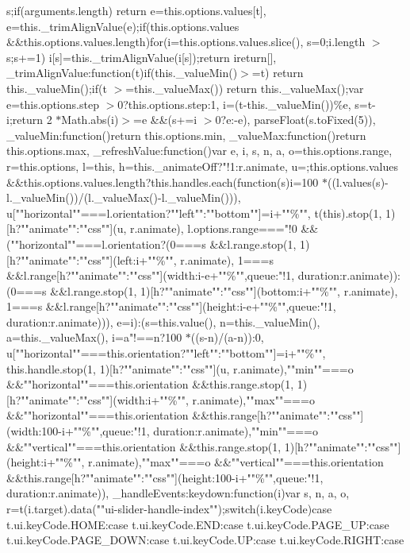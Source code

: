 {s;if(arguments.\+length) return e=this.\+options.\+values[t], e=this.\+\_\+trim\+Align\+Value(e);if(this.\+options.\+values \&\&this.\+options.\+values.\+length)\lcurly{}for(i=this.\+options.\+values.\+slice(), s=0;i.\+length $>$s;s+=1) i[s]=this.\+\_\+trim\+Align\+Value(i[s]);return i\rcurly{}return[]\rcurly{}, \+\_\+trim\+Align\+Value\+:function(t)\lcurly{}if(this.\+\_\+value\+Min()$>$=t) return this.\+\_\+value\+Min();if(t $>$=this.\+\_\+value\+Max()) return this.\+\_\+value\+Max();var e=this.\+options.\+step $>$0?this.\+options.\+step\+:1, i=(t-\/this.\+\_\+value\+Min())\%e, s=t-\/i;return 2 $\ast$\+Math.\+abs(i)$>$=e \&\&(s+=i $>$0?e\+:-\/e), parse\+Float(s.\+to\+Fixed(5))\rcurly{}, \+\_\+value\+Min\+:function()\lcurly{}return this.\+options.\+min\rcurly{}, \+\_\+value\+Max\+:function()\lcurly{}return this.\+options.\+max\rcurly{}, \+\_\+refresh\+Value\+:function()\lcurly{}var e, i, s, n, a, o=this.\+options.\+range, r=this.\+options, l=this, h=this.\+\_\+animate\+Off?"!1\+:r.\+animate, u=\lcurly{}\rcurly{};this.\+options.\+values \&\&this.\+options.\+values.\+length?this.\+handles.\+each(function(s)\lcurly{}i=100 $\ast$((l.\+values(s)-\/l.\+\_\+value\+Min())/(l.\+\_\+value\+Max()-\/l.\+\_\+value\+Min())), u[""horizontal""===l.\+orientation?""left""\+:""bottom""]=i+""\%"", t(this).\+stop(1, 1)[h?""animate""\+:""css""](u, r.\+animate), l.\+options.\+range==="!0 \&\&(""horizontal""===l.\+orientation?(0===s \&\&l.\+range.\+stop(1, 1)[h?""animate""\+:""css""](\lcurly{}left\+:i+""\%""\rcurly{}, r.\+animate), 1===s \&\&l.\+range[h?""animate""\+:""css""](\lcurly{}width\+:i-\/e+""\%""\rcurly{},\lcurly{}queue\+:"!1, duration\+:r.\+animate\rcurly{}))\+:(0===s \&\&l.\+range.\+stop(1, 1)[h?""animate""\+:""css""](\lcurly{}bottom\+:i+""\%""\rcurly{}, r.\+animate), 1===s \&\&l.\+range[h?""animate""\+:""css""](\lcurly{}height\+:i-\/e+""\%""\rcurly{},\lcurly{}queue\+:"!1, duration\+:r.\+animate\rcurly{}))), e=i\rcurly{})\+:(s=this.\+value(), n=this.\+\_\+value\+Min(), a=this.\+\_\+value\+Max(), i=a"!==n?100 $\ast$((s-\/n)/(a-\/n))\+:0, u[""horizontal""===this.\+orientation?""left""\+:""bottom""]=i+""\%"", this.\+handle.\+stop(1, 1)[h?""animate""\+:""css""](u, r.\+animate),""min""===o \&\&""horizontal""===this.\+orientation \&\&this.\+range.\+stop(1, 1)[h?""animate""\+:""css""](\lcurly{}width\+:i+""\%""\rcurly{}, r.\+animate),""max""===o \&\&""horizontal""===this.\+orientation \&\&this.\+range[h?""animate""\+:""css""](\lcurly{}width\+:100-\/i+""\%""\rcurly{},\lcurly{}queue\+:"!1, duration\+:r.\+animate\rcurly{}),""min""===o \&\&""vertical""===this.\+orientation \&\&this.\+range.\+stop(1, 1)[h?""animate""\+:""css""](\lcurly{}height\+:i+""\%""\rcurly{}, r.\+animate),""max""===o \&\&""vertical""===this.\+orientation \&\&this.\+range[h?""animate""\+:""css""](\lcurly{}height\+:100-\/i+""\%""\rcurly{},\lcurly{}queue\+:"!1, duration\+:r.\+animate\rcurly{}))\rcurly{}, \+\_\+handle\+Events\+:\lcurly{}keydown\+:function(i)\lcurly{}var s, n, a, o, r=t(i.\+target).\+data(""ui-\/slider-\/handle-\/index"");switch(i.\+key\+Code)\lcurly{}case t.\+ui.\+key\+Code.\+H\+O\+M\+E\+:case t.\+ui.\+key\+Code.\+E\+N\+D\+:case t.\+ui.\+key\+Code.\+P\+A\+G\+E\+\_\+\+U\+P\+:case t.\+ui.\+key\+Code.\+P\+A\+G\+E\+\_\+\+D\+O\+W\+N\+:case t.\+ui.\+key\+Code.\+U\+P\+:case t.\+ui.\+key\+Code.\+R\+I\+G\+H\+T\+:case }
